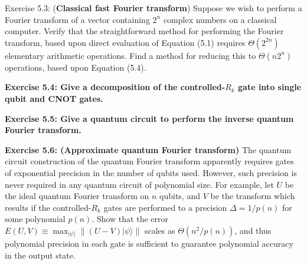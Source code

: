 \begin{exercise}
Exercise 5.3: (\textbf{Classical fast Fourier transform}) Suppose we wish to perform a Fourier transform of a vector containing $2^{n}$ complex numbers on a classical computer. Verify that the straightforward method for performing the Fourier transform, based upon direct evaluation of Equation (5.1) requires $\Theta\left(2^{2 n}\right)$ elementary arithmetic operations. Find a method for reducing this to $\Theta\left(n 2^{n}\right)$ operations, based upon Equation (5.4).
\end{exercise}

\begin{exercise}
\textbf{Exercise 5.4: Give a decomposition of the controlled-$R_{k}$ gate into single qubit and CNOT gates.}
\end{exercise}

\begin{exercise}
\textbf{Exercise 5.5: Give a quantum circuit to perform the inverse quantum Fourier transform.}
\end{exercise}

\begin{exercise}
\textbf{Exercise 5.6: (Approximate quantum Fourier transform)} The quantum circuit construction of the quantum Fourier transform apparently requires gates of exponential precision in the number of qubits used. However, such precision is never required in any quantum circuit of polynomial size. For example, let $U$ be the ideal quantum Fourier transform on $n$ qubits, and $V$ be the transform which results if the controlled-$R_{k}$ gates are performed to a precision $\Delta=1 / p(n)$ for some polynomial $p(n)$. Show that the error $E(U, V) \equiv \max _{|\psi\rangle} \|(U-V)|\psi\rangle \|$ scales as $\Theta\left(n^{2} / p(n)\right)$, and thus polynomial precision in each gate is sufficient to guarantee polynomial accuracy in the output state.
\end{exercise}


